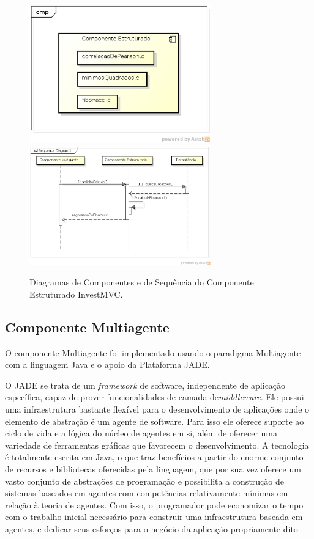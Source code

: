 \begin{figure}[H]
\centering
\includegraphics[width=0.7\textwidth]{figuras/componenteEstruturado}
\includegraphics[width=0.7\textwidth]{figuras/sequenciaEstruturado}
\caption{Diagramas de Componentes e de Sequência do Componente Estruturado InvestMVC.}
\label{sequenciaEstruturado}
\end{figure}

\subsection{Componente Multiagente}

O componente Multiagente foi implementado usando o paradigma Multiagente com a linguagem Java e o apoio da Plataforma JADE.

\begin{citacao}
O JADE se trata de um \textit{framework} de software, independente de aplicação específica, capaz de prover funcionalidades de camada de\textit{middleware}. Ele possui uma infraestrutura bastante flexível para o desenvolvimento de aplicações onde o elemento de abstração é um agente de  software. Para isso ele oferece suporte ao ciclo de vida e a lógica do núcleo de agentes em si, além de oferecer uma variedade de ferramentas gráficas que favorecem o desenvolvimento. A tecnologia é totalmente escrita em Java, o que traz benefícios a partir do enorme conjunto de recursos e bibliotecas oferecidas pela linguagem, que por sua vez oferece um vasto conjunto de abstrações de programação e possibilita a construção de sistemas baseados em agentes com competências relativamente mínimas em relação à teoria de agentes. Com isso, o programador pode economizar o tempo com o trabalho inicial necessário para construir uma infraestrutura baseada em agentes, e dedicar seus esforços para o negócio da aplicação propriamente dito \cite{teixeira2010}. 
\end{citacao}

